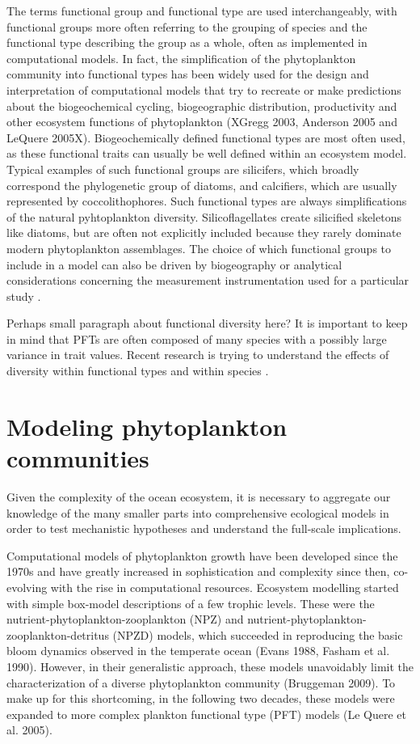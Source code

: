 The terms functional group and functional type are used interchangeably, with functional groups more often referring to the grouping of species and the functional type describing the group as a whole, often as implemented in computational models. In fact, the simplification of the phytoplankton community into functional types has been widely used for the design and interpretation of computational models that try to recreate or make predictions about the biogeochemical cycling, biogeographic distribution, productivity and other ecosystem functions of phytoplankton (XGregg 2003, Anderson 2005 and LeQuere 2005X). Biogeochemically defined functional types are most often used, as these functional traits can usually be well defined within an ecosystem model. Typical examples of such functional groups are silicifers, which broadly correspond the phylogenetic group of diatoms, and calcifiers, which are usually represented by coccolithophores. Such functional types are always simplifications of the natural pyhtoplankton diversity. Silicoflagellates create silicified skeletons like diatoms, but are often not explicitly included because they rarely dominate modern phytoplankton assemblages. The choice of which functional groups to include in a model can also be driven by biogeography or analytical considerations concerning the measurement instrumentation used for a particular study \citep{IrwinAndrewJ.Finkel2017b}. 

Perhaps small paragraph about functional diversity here?
It is important to keep in mind that PFTs are often composed of many species with a possibly large variance in trait values. Recent research is trying to understand the effects of diversity within functional types and within species \citep{Violle2012,Violle2017a,DesRoches2018}.

\section{Modeling phytoplankton communities}
Given the complexity of the ocean ecosystem, it is necessary to aggregate our knowledge of the many smaller parts into comprehensive ecological models in order to test mechanistic hypotheses and understand the full-scale implications. 

Computational models of phytoplankton growth have been developed since the 1970s and have greatly increased in sophistication and complexity since then, co-evolving with the rise in computational resources. Ecosystem modelling started with simple box-model descriptions of a few trophic levels. These were the nutrient-phytoplankton-zooplankton (NPZ) and nutrient-phytoplankton-zooplankton-detritus (NPZD) models, which succeeded in reproducing the basic bloom dynamics observed in the temperate ocean (Evans 1988, Fasham et al. 1990). However, in their generalistic approach, these models unavoidably limit the characterization of a diverse phytoplankton community (Bruggeman 2009). To make up for this shortcoming, in the following two decades, these models were expanded to more complex plankton functional type (PFT) models (Le Quere et al. 2005). 

